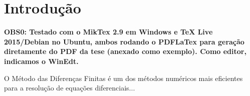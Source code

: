 \chapter{Introdução}

\textbf{OBS0: Testado com o MikTex 2.9 em Windows e TeX Live 2015/Debian no Ubuntu, ambos rodando o PDFLaTex para geração diretamente do PDF da tese (anexado como exemplo). Como editor, indicamos o WinEdt.}

%
%

O Método das Diferenças Finitas é um dos métodos numéricos mais eficientes
para a resolução de equações diferenciais...

%
%
%
%
%


